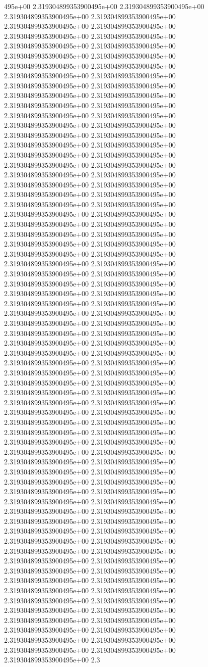 495e+00	2.319304899353900495e+00	2.319304899353900495e+00	2.319304899353900495e+00	2.319304899353900495e+00	2.319304899353900495e+00	2.319304899353900495e+00	2.319304899353900495e+00	2.319304899353900495e+00	2.319304899353900495e+00	2.319304899353900495e+00	2.319304899353900495e+00	2.319304899353900495e+00	2.319304899353900495e+00	2.319304899353900495e+00	2.319304899353900495e+00	2.319304899353900495e+00	2.319304899353900495e+00	2.319304899353900495e+00	2.319304899353900495e+00	2.319304899353900495e+00	2.319304899353900495e+00	2.319304899353900495e+00	2.319304899353900495e+00	2.319304899353900495e+00	2.319304899353900495e+00	2.319304899353900495e+00	2.319304899353900495e+00	2.319304899353900495e+00	2.319304899353900495e+00	2.319304899353900495e+00	2.319304899353900495e+00	2.319304899353900495e+00	2.319304899353900495e+00	2.319304899353900495e+00	2.319304899353900495e+00	2.319304899353900495e+00	2.319304899353900495e+00	2.319304899353900495e+00	2.319304899353900495e+00	2.319304899353900495e+00	2.319304899353900495e+00	2.319304899353900495e+00	2.319304899353900495e+00	2.319304899353900495e+00	2.319304899353900495e+00	2.319304899353900495e+00	2.319304899353900495e+00	2.319304899353900495e+00	2.319304899353900495e+00	2.319304899353900495e+00	2.319304899353900495e+00	2.319304899353900495e+00	2.319304899353900495e+00	2.319304899353900495e+00	2.319304899353900495e+00	2.319304899353900495e+00	2.319304899353900495e+00	2.319304899353900495e+00	2.319304899353900495e+00	2.319304899353900495e+00	2.319304899353900495e+00	2.319304899353900495e+00	2.319304899353900495e+00	2.319304899353900495e+00	2.319304899353900495e+00	2.319304899353900495e+00	2.319304899353900495e+00	2.319304899353900495e+00	2.319304899353900495e+00	2.319304899353900495e+00	2.319304899353900495e+00	2.319304899353900495e+00	2.319304899353900495e+00	2.319304899353900495e+00	2.319304899353900495e+00	2.319304899353900495e+00	2.319304899353900495e+00	2.319304899353900495e+00	2.319304899353900495e+00	2.319304899353900495e+00	2.319304899353900495e+00	2.319304899353900495e+00	2.319304899353900495e+00	2.319304899353900495e+00	2.319304899353900495e+00	2.319304899353900495e+00	2.319304899353900495e+00	2.319304899353900495e+00	2.319304899353900495e+00	2.319304899353900495e+00	2.319304899353900495e+00	2.319304899353900495e+00	2.319304899353900495e+00	2.319304899353900495e+00	2.319304899353900495e+00	2.319304899353900495e+00	2.319304899353900495e+00	2.319304899353900495e+00	2.319304899353900495e+00	2.319304899353900495e+00	2.319304899353900495e+00	2.319304899353900495e+00	2.319304899353900495e+00	2.319304899353900495e+00	2.319304899353900495e+00	2.319304899353900495e+00	2.319304899353900495e+00	2.319304899353900495e+00	2.319304899353900495e+00	2.319304899353900495e+00	2.319304899353900495e+00	2.319304899353900495e+00	2.319304899353900495e+00	2.319304899353900495e+00	2.319304899353900495e+00	2.319304899353900495e+00	2.319304899353900495e+00	2.319304899353900495e+00	2.319304899353900495e+00	2.319304899353900495e+00	2.319304899353900495e+00	2.319304899353900495e+00	2.319304899353900495e+00	2.319304899353900495e+00	2.319304899353900495e+00	2.319304899353900495e+00	2.319304899353900495e+00	2.319304899353900495e+00	2.319304899353900495e+00	2.319304899353900495e+00	2.319304899353900495e+00	2.319304899353900495e+00	2.319304899353900495e+00	2.3